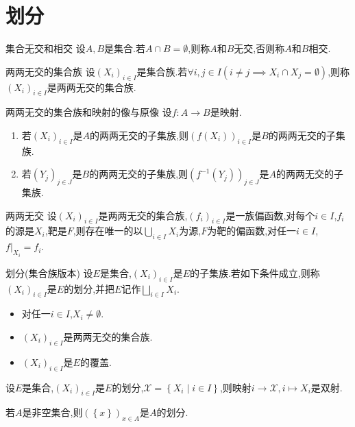 \section{划分}

\begin{definition}{集合无交和相交}{}
	设$A,B$是集合.若$A\cap B=\emptyset$,则称$A$和$B$无交,否则称$A$和$B$相交.
\end{definition}

\begin{definition}{两两无交的集合族}{}
	设$\left(X_{i}\right)_{i\in I}$是集合族.若$\forall i,j\in I\left(i\neq j\implies X_{i}\cap X_{j}=\emptyset\right)$,则称$\left(X_{i}\right)_{i\in I}$是两两无交的集合族.
\end{definition}

\begin{proposition}{两两无交的集合族和映射的像与原像}{}
	设$f:A\to B$是映射.
	\begin{enumerate}
		\item 若$\left(X_{i}\right)_{i\in I}$是$A$的两两无交的子集族,则$\left(f\left(X_{i}\right)\right)_{i\in I}$是$B$的两两无交的子集族.
		\item 若$\left(Y_{j}\right)_{j\in J}$是$B$的两两无交的子集族,则$\left(f^{-1}\left(Y_{j}\right)\right)_{j\in J}$是$A$的两两无交的子集族.
	\end{enumerate}
\end{proposition}

\begin{proposition}{两两无交}{}
	设$\left(X_{i}\right)_{i\in I}$是两两无交的集合族,$\left(f_{i}\right)_{i\in I}$是一族偏函数,对每个$i\in I$,$f_{i}$的源是$X_{i}$,靶是$F$,则存在唯一的以$\bigcup\limits_{i\in I}X_{i}$为源,$F$为靶的偏函数,对任一$i\in I$,$f|_{X_{i}}=f_{i}$.
\end{proposition}

\begin{definition}{划分(集合族版本)}{}
	设$E$是集合,$\left(X_{i}\right)_{i\in I}$是$E$的子集族.若如下条件成立,则称$\left(X_{i}\right)_{i\in I}$是$E$的划分,并把$E$记作$\bigsqcup\limits_{i\in I}X_{i}$.
	\begin{itemize}
		\item 对任一$i\in I$,$X_{i}\neq\emptyset$.
		\item $\left(X_{i}\right)_{i\in I}$是两两无交的集合族.
		\item $\left(X_{i}\right)_{i\in I}$是$E$的覆盖.
	\end{itemize}
\end{definition}

\begin{proposition}{}{}
	设$E$是集合,$\left(X_{i}\right)_{i\in I}$是$E$的划分,$\mathcal{X}=\left\{X_{i}\middle|i\in I\right\}$,则映射$i\to\mathcal{X},i\mapsto X_{i}$是双射.
\end{proposition}

\begin{example}{}{}
	若$A$是非空集合,则$\left(\left\{x\right\}\right)_{x\in A}$是$A$的划分.
\end{example}






